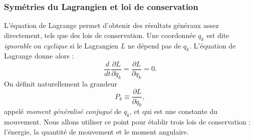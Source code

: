 \subsubsection{Symétries du Lagrangien et loi de conservation}
L'équation de Lagrange permet d'obtenir des résultats généraux assez directement, tels que des lois de conservation. Une coordonnée $q_k$ est dite \textit{ignorable} ou \textit{cyclique} si le Lagrangien $L$ ne dépend pas de $q_k$. L'équation de Lagrange donne alors :
\begin{equation*}
\frac{d}{dt}\frac{\partial L}{\partial \dot{q}_k} = \frac{\partial L}{\partial q_k} = 0.
\end{equation*}
On définit naturellement la grandeur 
\begin{equation*}
P_k\equiv\frac{\partial L}{\partial \dot{q}_k},
\end{equation*}
appelé \textit{moment généralisé conjugué} de $q_k$, et qui est une constante du mouvement. Nous allons utiliser ce point pour établir trois lois de conservation : l'énergie, la quantité de mouvement et le moment angulaire.


